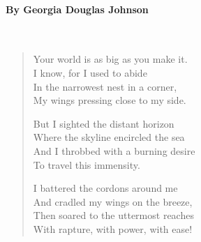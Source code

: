 \documentclass[11pt, letterpaper]{memoir}
\begin{document}
\paragraph{By Georgia Douglas Johnson}~
\begin{verse}
	Your world is as big as you make it.\\
	I know, for I used to abide\\
	In the narrowest nest in a corner,\\
	My wings pressing close to my side.

	But I sighted the distant horizon\\
	Where the skyline encircled the sea\\
	And I throbbed with a burning desire\\
	To travel this immensity.

	I battered the cordons around me\\
	And cradled my wings on the breeze,\\
	Then soared to the uttermost reaches\\
	With rapture, with power, with ease!
\end{verse}
\end{document}
